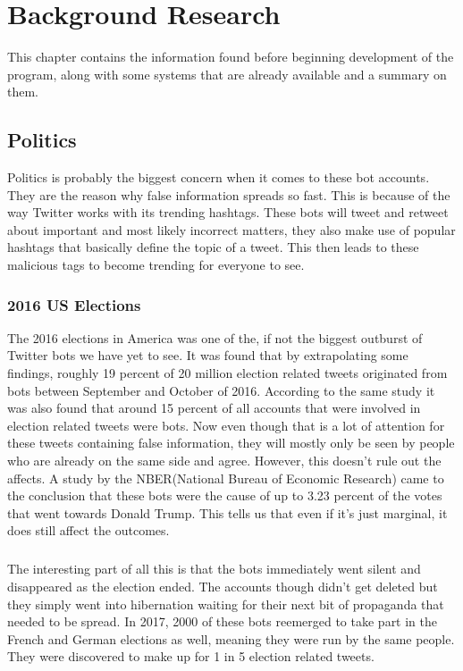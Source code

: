 
\chapter{Background Research}
\label{Chapter2}

This chapter contains the information found before beginning development of the program, along with some systems that are already available and a summary on them. 

\section{Politics}
Politics is probably the biggest concern when it comes to these bot accounts. They are the reason why false information spreads so fast. This is because of the way Twitter works with its trending hashtags. These bots will tweet and retweet about important and most likely incorrect matters, they also make use of popular hashtags that basically define the topic of a tweet. This then leads to these malicious tags to become trending for everyone to see.

\subsection{2016 US Elections}
The 2016 elections in America was one of the, if not the biggest outburst of Twitter bots we have yet to see. It was found that by extrapolating some findings, roughly 19 percent of 20 million election related tweets originated from bots between September and October of 2016. %
According to the same study it was also found that around 15 percent of all accounts that were involved in election related tweets were bots. Now even though that is a lot of attention for these tweets containing false information, they will mostly only be seen by people who are already on the same side and agree. However, this doesn't rule out the affects. A study by the NBER(National Bureau of Economic Research) came to the conclusion that these bots were the cause of up to 3.23 percent of the votes that went towards Donald Trump. %
This tells us that even if it's just marginal, it does still affect the outcomes.
\paragraph{} The interesting part of all this is that the bots immediately went silent and disappeared as the election ended. The accounts though didn't get deleted but they simply went into hibernation waiting for their next bit of propaganda that needed to be spread. In 2017, 2000 of these bots reemerged to take part in the French and German elections as well, meaning they were run by the same people. They were discovered to make up for 1 in 5 election related tweets. %
